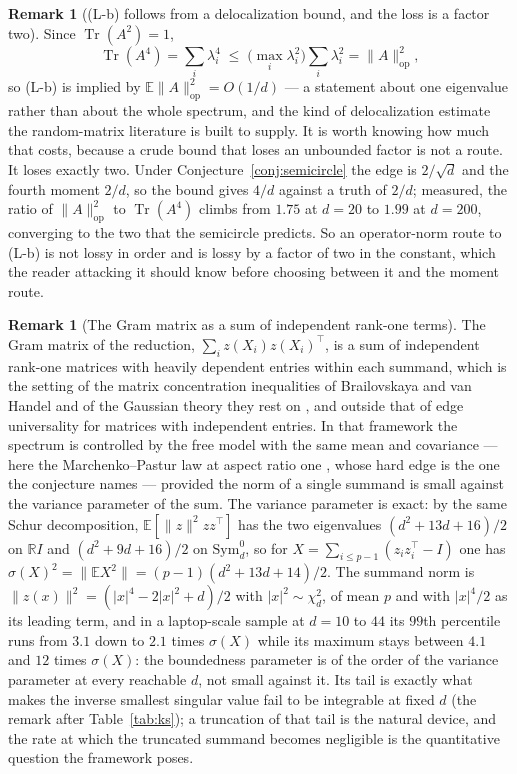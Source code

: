 \documentclass[11pt]{article}
\theoremstyle{definition}
\newtheorem{remark}[theorem]{Remark}
\DeclareMathOperator{\Tr}{Tr}
\newcommand{\R}{\mathbb{R}}
\newcommand{\E}{\mathbb{E}}
\newcommand{\numMomDmax}{200}
\newcommand{\numMomDmin}{20}
\newcommand{\numOpRatioFirst}{1.75}
\newcommand{\numOpRatioLast}{1.99}
\newcommand{\numVhDmax}{44}
\newcommand{\numVhDmin}{10}
\newcommand{\numVhRmaxMax}{12}
\newcommand{\numVhRmaxMin}{4.1}
\newcommand{\numVhRqFirst}{3.1}
\newcommand{\numVhRqLast}{2.1}
\begin{document}
\begin{remark}[(L-b) follows from a delocalization bound, and the loss is a factor two]
Since $\Tr(A^2)=1$,
\[
\Tr(A^4)=\sum_i\lambda_i^4\;\le\;\Big(\max_i\lambda_i^2\Big)\sum_i\lambda_i^2=\|A\|_{\mathrm{op}}^2 ,
\]
so (L-b) is implied by $\E\|A\|_{\mathrm{op}}^2=O(1/d)$ --- a statement about one eigenvalue rather
than about the whole spectrum, and the kind of delocalization estimate the random-matrix literature
is built to supply. It is worth knowing how much that costs, because a crude bound that loses an
unbounded factor is not a route. It loses exactly two. Under Conjecture~\ref{conj:semicircle} the
edge is $2/\sqrt d$ and the fourth moment $2/d$, so the bound gives $4/d$ against a truth of $2/d$;
measured, the ratio of $\|A\|_{\mathrm{op}}^2$ to $\Tr(A^4)$ climbs from $\numOpRatioFirst$ at
$d=\numMomDmin$ to $\numOpRatioLast$ at $d=\numMomDmax$, converging to the two that the semicircle
predicts. So an operator-norm route to (L-b) is not lossy in order and is lossy by a factor of two in
the constant, which the reader attacking it should know before choosing between it and the moment
route.
\end{remark}

\begin{remark}[The Gram matrix as a sum of independent rank-one terms]
The Gram matrix of the reduction, $\sum_{i}z(X_i)z(X_i)^\top$, is a sum of independent rank-one
matrices with heavily dependent entries within each summand, which is the setting of the matrix
concentration inequalities of Brailovskaya and van Handel \cite{BvH} and of the Gaussian theory they
rest on \cite{BBvH}, and outside that of edge universality for matrices with independent entries. In
that framework the spectrum is controlled by the free model with the same mean and covariance --- here
the Marchenko--Pastur law at aspect ratio one \cite{MarchenkoPastur}, whose hard edge is the one the
conjecture names --- provided the norm of a single summand is small against the variance parameter
of the sum. The variance parameter is exact: by the same Schur decomposition, $\E[\|z\|^2zz^\top]$
has the two eigenvalues $(d^2+13d+16)/2$ on $\R I$ and $(d^2+9d+16)/2$ on $\mathrm{Sym}_d^0$, so for
$X=\sum_{i\le p-1}(z_iz_i^\top-I)$ one has $\sigma(X)^2=\|\E X^2\|=(p-1)(d^2+13d+14)/2$. The summand
norm is $\|z(x)\|^2=(|x|^4-2|x|^2+d)/2$ with $|x|^2\sim\chi^2_d$, of mean $p$ and with $|x|^4/2$ as
its leading term, and in a laptop-scale sample at $d=\numVhDmin$ to $\numVhDmax$ its $99$th
percentile runs from $\numVhRqFirst$ down to $\numVhRqLast$ times $\sigma(X)$ while its maximum
stays between $\numVhRmaxMin$ and $\numVhRmaxMax$ times $\sigma(X)$: the boundedness parameter is of
the order of the variance parameter at every reachable $d$, not small against it. Its tail is exactly what makes the inverse
smallest singular value fail to be integrable at fixed $d$ (the remark after Table~\ref{tab:ks}); a
truncation of that tail is the natural device, and the rate at which the truncated summand becomes
negligible is the quantitative question the framework poses.
\end{remark}
\end{document}
